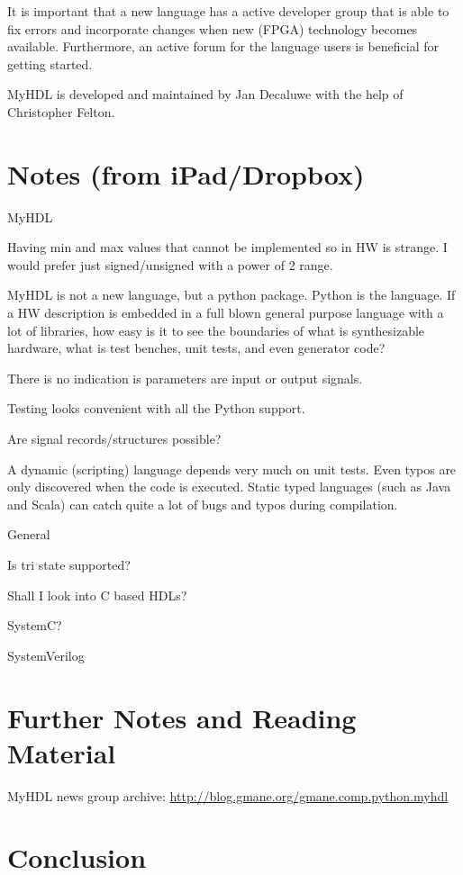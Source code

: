 \documentclass[10pt, technote, draftcls, onecolumn]{IEEEtran}
\begin{document}
It is important that a new language has a active developer group that is
able to fix errors and incorporate changes when new (FPGA) technology
becomes available. Furthermore, an active forum for the language users
is beneficial for getting started.

MyHDL is developed and maintained by Jan Decaluwe with the help of
Christopher Felton.  

\section{Notes (from iPad/Dropbox)}

MyHDL

Having min and max values that cannot be implemented so in HW is strange. I would prefer just signed/unsigned with a power of 2 range.

MyHDL is not a new language, but a python package. Python is the language. If a HW description is embedded in a full blown general purpose language with a lot of libraries, how easy is it to see the boundaries of what is synthesizable hardware, what is test benches, unit tests, and even generator code?

There is no indication is parameters are input or output signals.

Testing looks convenient with all the Python support.

Are signal records/structures possible?

A dynamic (scripting) language depends very much on unit tests. Even typos are only
discovered when the code is executed. Static typed languages (such as Java
and Scala) can catch quite a lot of bugs and typos during compilation.

General

Is tri state supported?

Shall I look into C based HDLs?

SystemC?

SystemVerilog

\section{Further Notes and Reading Material}

MyHDL news group archive: \url{http://blog.gmane.org/gmane.comp.python.myhdl}






\section{Conclusion}
\label{sec:conclusion}
\end{document}
